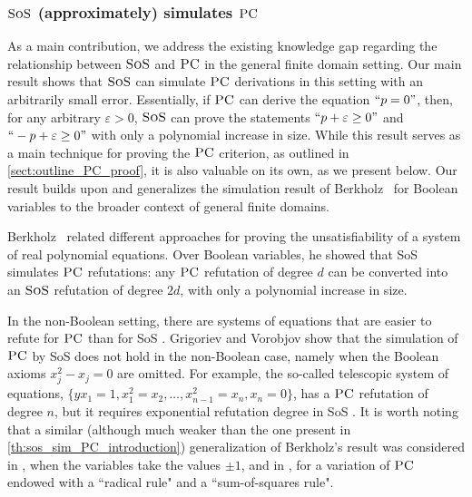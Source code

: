 \documentclass[11pt]{article}
\newcommand{\sos}{\text{\sc{SoS}}}
\newcommand{\PC}{\textsc{PC}}
\newcommand{\1}{\textbf{1}}
\begin{document}
\subsubsection*{$\sos$ (approximately) simulates $\PC$}\label{sect:PC_criterion_introduction}

As a main contribution, we address the existing knowledge gap regarding the relationship between $\sos$ and $\PC$ in the general finite domain setting.
Our main result shows that $\sos$ can simulate $\PC$ derivations in this setting with an arbitrarily small error. Essentially, if $\PC$ can derive the equation $``p=0"$, then, for any arbitrary $\varepsilon>0$, $\sos$ can prove the statements $``p+\varepsilon\geq 0"$ and $``-p+\varepsilon \geq 0"$ with only a polynomial increase in size.
While this result serves as a main technique for proving the $\PC$ criterion, as outlined in \cref{sect:outline_PC_proof}, it is also valuable on its own, as we present below.
Our result builds upon and generalizes the simulation result of Berkholz~\cite{berkholz18} for Boolean variables to the broader context of general finite domains.

Berkholz~\cite{berkholz18} related different approaches for proving the unsatisfiability of a system of real polynomial equations. Over Boolean variables, he showed that SoS simulates $\PC$ refutations: any \(\PC\) refutation of degree \(d\) can be converted into an \(\sos\) refutation of degree \(2d\), with only a polynomial increase in size.

In the non-Boolean setting, there are systems of equations that are easier to refute for $\PC$ than for SoS \cite{GrigorievV01}. Grigoriev and Vorobjov \cite{GrigorievV01} show that the simulation of $\PC$ by SoS does not hold in the non-Boolean case, namely when the Boolean axioms $x_j^2-x_j=0$ are omitted. For example, the so-called telescopic system of equations, $\{ yx_1=1, x_1^2=x_2, \ldots, x_{n-1}^2=x_n, x_n=0\}$, has a $\PC$ refutation of degree $n$, but it requires exponential refutation degree in SoS \cite{GrigorievV01}. It is worth noting that a similar (although much weaker than the one present in \cref{th:sos_sim_PC_introduction}) generalization of Berkholz's result was considered in \cite{Sokolov20}, when the variables take the values $\pm 1$, and in \cite{PartFTT21}, for a variation of $\PC$ endowed with a ``radical rule" and a ``sum-of-squares rule".
\end{document}
